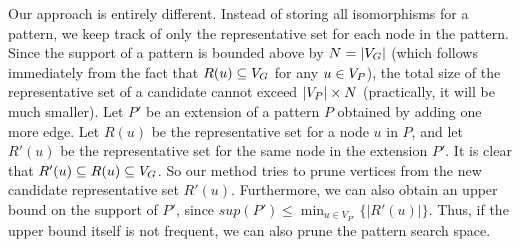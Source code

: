 Our approach is entirely different. Instead of storing all isomorphisms
for a pattern, we keep track of only the representative set for each
node in the pattern.  Since the support of a pattern is bounded above by
$N=|V_G|$ (which follows immediately from the fact that $R(u) \subseteq
V_G$ for any $u \in V_P$), the total size of the representative set of a
candidate cannot exceed $|V_P| \times N$ (practically, it will be much
smaller).  Let $P'$ be an extension of a pattern $P$ obtained by adding
one more edge. Let $R(u)$ be the representative set for a node $u$ in
$P$, and let $R'(u)$ be the representative set for the same node in the
extension $P'$. It is clear that $R'(u) \subseteq R(u) \subseteq V_G$.
So our method tries to prune vertices from the new candidate
representative set $R'(u)$. 
Furthermore, we can also obtain an upper
bound on the support of $P'$, since $sup(P') \le \min_{u \in V_{P'}}
\{|R'(u)|\}$. Thus, if the upper bound itself is not frequent, we can
also prune the pattern search space.
\fi

